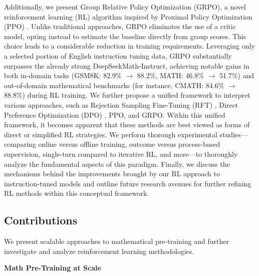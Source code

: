Additionally, we present Group Relative Policy Optimization (GRPO), a novel reinforcement learning (RL) algorithm inspired by Proximal Policy Optimization (PPO) \citep{schulman2017proximal}. Unlike traditional approaches, GRPO eliminates the use of a critic model, opting instead to estimate the baseline directly from group scores. This choice leads to a considerable reduction in training requirements. Leveraging only a selected portion of English instruction tuning data, GRPO substantially surpasses the already strong DeepSeekMath-Instruct, achieving notable gains in both in-domain tasks (GSM8K: 82.9\% $\rightarrow$ 88.2\%, MATH: 46.8\% $\rightarrow$ 51.7\%) and out-of-domain mathematical benchmarks (for instance, CMATH: 84.6\% $\rightarrow$ 88.8\%) during RL training. We further propose a unified framework to interpret various approaches, such as Rejection Sampling Fine-Tuning (RFT) \citep{yuan2023scaling}, Direct Preference Optimization (DPO) \citep{dpo}, PPO, and GRPO. Within this unified framework, it becomes apparent that these methods are best viewed as forms of direct or simplified RL strategies. We perform thorough experimental studies—comparing online versus offline training, outcome versus process-based supervision, single-turn compared to iterative RL, and more—to thoroughly analyze the fundamental aspects of this paradigm. Finally, we discuss the mechanisms behind the improvements brought by our RL approach to instruction-tuned models and outline future research avenues for further refining RL methods within this conceptual framework.

\subsection{Contributions}
We present scalable approaches to mathematical pre-training and further investigate and analyze reinforcement learning methodologies.

\textbf{Math Pre-Training at Scale}

